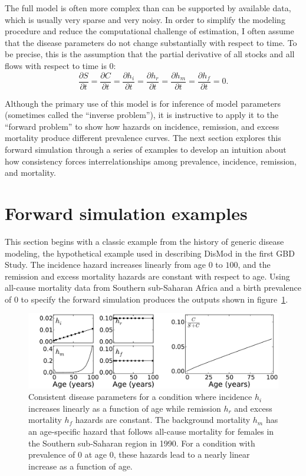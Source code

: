 The full model is often more complex than can be supported by
available data, which is usually very sparse and very noisy.  In order
to simplify the modeling procedure and reduce the computational challenge
of estimation, I often assume that the disease parameters do not change
substantially with respect to time. To be precise, this is the assumption
that the partial derivative of all stocks and all flows with respect
to time is $0$:
\[
\frac{\partial S}{\partial t}
=
\frac{\partial C}{\partial t}
=
\frac{\partial h_i}{\partial t}
=
\frac{\partial h_r}{\partial t}
=
\frac{\partial h_m}{\partial t}
=
\frac{\partial h_f}{\partial t}
=
0.
\]

Although the primary use of this model is for inference of model
parameters (sometimes called the ``inverse problem''), it is
instructive to apply it to the ``forward problem'' to show how hazards on incidence,
remission, and excess mortality produce different prevalence
curves. The next section explores this forward simulation through a
series of examples to develop an intuition about how consistency
forces interrelationships among prevalence, incidence, remission,
and mortality.


\section{Forward simulation examples}

This section begins with a classic example from the history of generic
disease modeling, the hypothetical example used in describing DisMod
in the first GBD Study.\cite{murray_global_1996}
The incidence hazard increases linearly from age $0$ to
$100$, and the remission and excess mortality hazards are constant with
respect to age.  Using all-cause mortality data from Southern sub-Saharan
Africa and a birth prevalence of $0$ to specify
the forward simulation produces the outputs shown in
figure~\ref{forward-sim-ex1}.

\begin{figure}[htb]
\begin{center}
\includegraphics[width=\textwidth]{initial.pdf}
\caption[Consistent disease parameters for a condition.]{Consistent 
  disease parameters for a condition where incidence
  $h_i$ increases linearly as a function of age while remission
  $h_r$ and excess mortality $h_f$ hazards are constant. The
  background mortality $h_m$ has an age-specific hazard that follows
  all-cause mortality for females in the Southern sub-Saharan region
  in 1990. For a condition with prevalence of $0$ at age $0$, these
  hazards lead to a nearly linear increase as a function of age.}
\label{forward-sim-ex1}
\end{center}
\end{figure}

